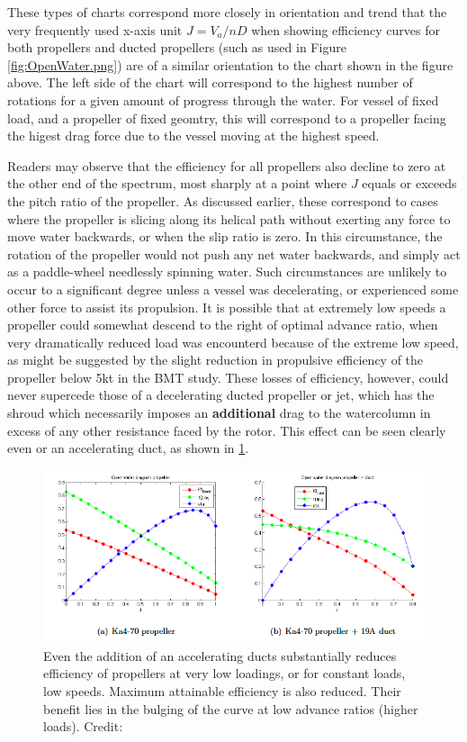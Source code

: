 \documentclass{article}\usepackage[]{graphicx}\usepackage[]{color}
\begin{document}
These types of charts correspond more closely in orientation and trend that the very frequently used x-axis unit $J = V_a/nD$ when showing efficiency curves for both propellers and ducted propellers (such as used in Figure \ref{fig:OpenWater.png}) are of a similar orientation to the chart shown in the figure above.  The left side of the chart will correspond to the highest number of rotations for a given amount of progress through the water.  For vessel of fixed load, and a propeller of fixed geomtry, this will correspond to a propeller facing the higest drag force due to the vessel moving at the highest speed.

Readers may observe that the efficiency for all propellers also decline to zero at the other end of the spectrum, most sharply at a point where $J$ equals or exceeds the pitch ratio of the propeller.  As discussed earlier, these correspond to cases where the propeller is slicing along its helical path without exerting any force to move water backwards, or when the slip ratio is zero.  In this circumstance, the rotation of the propeller would not push any net water backwards, and simply act as a paddle-wheel needlessly spinning water.  Such circumstances are unlikely to occur to a significant degree unless a vessel was decelerating, or experienced some other force to assist its propulsion.  It is possible that at extremely low speeds a propeller could somewhat descend to the right of optimal advance ratio, when very dramatically reduced load was encounterd because of the extreme low speed, as might be suggested by the slight reduction in propulsive efficiency of the propeller below 5kt in the BMT study.  These losses of efficiency, however, could never supercede those of a decelerating ducted propeller or jet, which has the shroud which necessarily imposes an \textbf{additional} drag to the watercolumn in excess of any other resistance faced by the rotor.  This effect can be seen clearly even or an accelerating duct, as shown in \ref{fig:PropDuct.png}.

\begin{figure}
\includegraphics[width=\textwidth]{PropDuct.png}
\caption{Even the addition of an accelerating ducts substantially reduces efficiency of propellers at very low loadings, or for constant loads, low speeds.  Maximum attainable efficiency is also reduced. Their benefit lies in the bulging of the curve at low advance ratios (higher loads).  Credit: \cite[6]{willemsen2013}}
\label{fig:PropDuct.png}
\end{figure}
\end{document}
